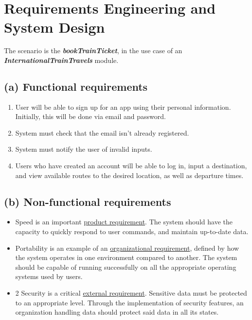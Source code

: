 \documentclass{article}
\begin{document}

\tableofcontents
\thispagestyle{empty}

\newpage
\setcounter{page}{1} 
\setcounter{section}{1} 

\section{Requirements Engineering and System Design}
The scenario is the \textbf{\textit{bookTrainTicket}}, in the use case of an \textbf{\textit{InternationalTrainTravels}} module.
\subsection{(a) Functional requirements}
\begin{enumerate}
	\item User will be able  to sign up for an app using their personal information. Initially, this will be done via email and password.
	\item System must check that the email isn't already registered.
	\item System must notify the user of invalid inputs.
	\item Users who have created an account will be able to log in, input a destination, and view available routes to the desired location, as well as departure times.
\end{enumerate}

\subsection{(b) Non-functional requirements}
\begin{itemize}
	\item Speed is an important \underline{product requirement}. The system should have the capacity to quickly respond to user commands, and maintain up-to-date data. 
	\item Portability is an example of an \underline{organizational requirement}, defined by how the system operates in one environment compared to another. The system should be capable of running successfully on all the appropriate operating systems used by users.
	\item 2 Security is a critical \underline{external requirement}. Sensitive data must be protected to an appropriate level. Through the implementation of security features, an organization handling data should protect said data in all its states.
\end{itemize}
\newpage
\end{document}
